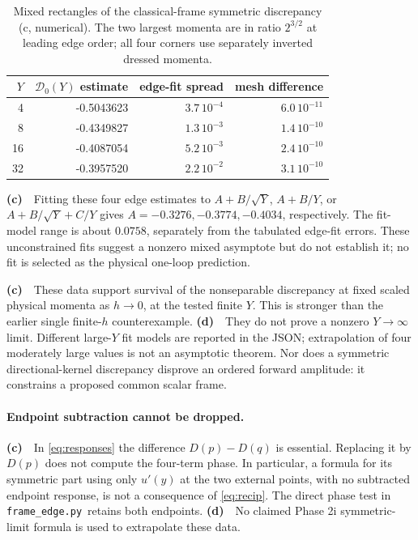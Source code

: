 \documentclass[11pt,a4paper]{article}
\newcommand{\Lc}{\textbf{(c)}\ }
\newcommand{\Ld}{\textbf{(d)}\ }
\newcommand{\ed}{\texttt{frame\_\allowbreak edge.py}}
\begin{document}
\par
\begin{table}[ht]\centering\small
\begin{tabular}{rrrr}\toprule
$Y$ & $\mathcal D_0(Y)$ estimate & edge-fit spread & mesh difference\\\midrule
4 & -0.5043623 & $3.7\,10^{-4}$ & $6.0\,10^{-11}$\\
8 & -0.4349827 & $1.3\,10^{-3}$ & $1.4\,10^{-10}$\\
16 & -0.4087054 & $5.2\,10^{-3}$ & $2.4\,10^{-10}$\\
32 & -0.3957520 & $2.2\,10^{-2}$ & $3.1\,10^{-10}$\\
\bottomrule\end{tabular}
\caption{Mixed rectangles of the classical-frame symmetric discrepancy (c, numerical). The two largest momenta are in ratio $2^{3/2}$ at leading edge order; all four corners use separately inverted dressed momenta.}\label{tab:rect}
\end{table}
\par

\Lc\ Fitting these four edge estimates to $A+B/\sqrt Y$, $A+B/Y$, or $A+B/\sqrt Y+C/Y$ gives $A=-0.3276,-0.3774,-0.4034$, respectively. The fit-model range is about $0.0758$, separately from the tabulated edge-fit errors. These unconstrained fits suggest a nonzero mixed asymptote but do not establish it; no fit is selected as the physical one-loop prediction.

\Lc\ These data support survival of the nonseparable discrepancy at fixed
scaled physical momenta as $h\to0$, at the tested finite $Y$. This is stronger
than the earlier single finite-$h$ counterexample. \Ld\ They do not prove a
nonzero $Y\to\infty$ limit. Different large-$Y$ fit models are reported in
the JSON; extrapolation of four moderately large values is not an asymptotic
theorem. Nor does a symmetric directional-kernel discrepancy disprove an
ordered forward amplitude: it constrains a proposed common scalar frame.

\paragraph{Endpoint subtraction cannot be dropped.}
\Lc\ In \eqref{eq:responses} the difference $D(p)-D(q)$ is essential.
Replacing it by $D(p)$ does not compute the four-term phase. In particular,
a formula for its symmetric part using only $u'(y)$ at the two external
points, with no subtracted endpoint response, is not a consequence of
\eqref{eq:recip}. The direct phase test in \ed\ retains both endpoints.
\Ld\ No claimed Phase 2i symmetric-limit formula is used to extrapolate
these data.
\end{document}
